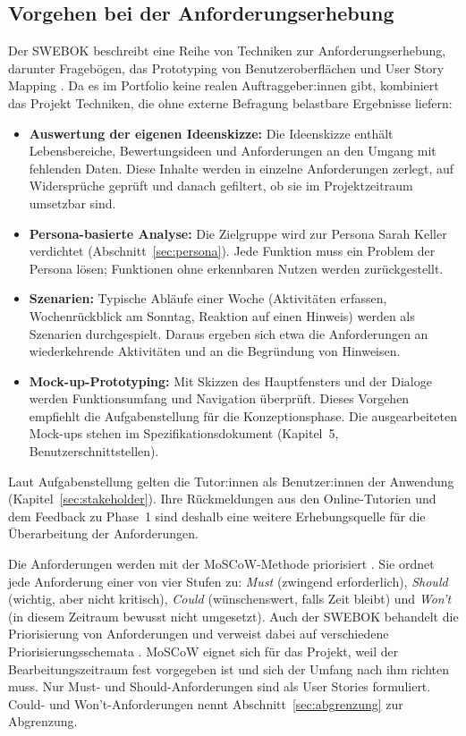\subsection{Vorgehen bei der Anforderungserhebung}
Der \ac{SWEBOK} beschreibt eine Reihe von Techniken zur Anforderungserhebung, darunter Fragebögen, das Prototyping von Benutzeroberflächen und User Story Mapping \parencite[S.~1-7]{swebok2026}. Da es im Portfolio keine realen Auftraggeber:innen gibt, kombiniert das Projekt Techniken, die ohne externe Befragung belastbare Ergebnisse liefern:
\begin{itemize}
  \item \textbf{Auswertung der eigenen Ideenskizze:} Die Ideenskizze enthält Lebensbereiche, Bewertungsideen und Anforderungen an den Umgang mit fehlenden Daten. Diese Inhalte werden in einzelne Anforderungen zerlegt, auf Widersprüche geprüft und danach gefiltert, ob sie im Projektzeitraum umsetzbar sind.
  \item \textbf{Persona-basierte Analyse:} Die Zielgruppe wird zur Persona Sarah Keller verdichtet (Abschnitt~\ref{sec:persona}). Jede Funktion muss ein Problem der Persona lösen; Funktionen ohne erkennbaren Nutzen werden zurückgestellt.
  \item \textbf{Szenarien:} Typische Abläufe einer Woche (Aktivitäten erfassen, Wochenrückblick am Sonntag, Reaktion auf einen Hinweis) werden als Szenarien durchgespielt. Daraus ergeben sich etwa die Anforderungen an wiederkehrende Aktivitäten und an die Begründung von Hinweisen.
  \item \textbf{Mock-up-Prototyping:} Mit Skizzen des Hauptfensters und der Dialoge werden Funktionsumfang und Navigation überprüft. Dieses Vorgehen empfiehlt die Aufgabenstellung für die Konzeptionsphase. Die ausgearbeiteten Mock-ups stehen im Spezifikationsdokument (Kapitel~5, Benutzerschnittstellen).
\end{itemize}
Laut Aufgabenstellung gelten die Tutor:innen als Benutzer:innen der Anwendung (Kapitel~\ref{sec:stakeholder}). Ihre Rückmeldungen aus den Online-Tutorien und dem Feedback zu Phase~1 sind deshalb eine weitere Erhebungsquelle für die Überarbeitung der Anforderungen.

Die Anforderungen werden mit der \acs{MoSCoW}-Methode priorisiert \parencite[Kap.~10]{dsdm2014}. Sie ordnet jede Anforderung einer von vier Stufen zu: \emph{Must} (zwingend erforderlich), \emph{Should} (wichtig, aber nicht kritisch), \emph{Could} (wünschenswert, falls Zeit bleibt) und \emph{Won't} (in diesem Zeitraum bewusst nicht umgesetzt). Auch der \ac{SWEBOK} behandelt die Priorisierung von Anforderungen und verweist dabei auf verschiedene Priorisierungsschemata \parencite[S.~1-18]{swebok2026}. MoSCoW eignet sich für das Projekt, weil der Bearbeitungszeitraum fest vorgegeben ist und sich der Umfang nach ihm richten muss. Nur Must- und Should-Anforderungen sind als User Stories formuliert. Could- und Won't-Anforderungen nennt Abschnitt~\ref{sec:abgrenzung} zur Abgrenzung.

